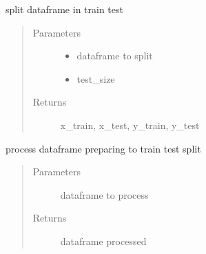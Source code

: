 \documentclass[letterpaper,10pt,english]{sphinxmanual}
\begin{document}
\begin{fulllineitems}
\label{\detokenize{algorithms:algorithms.isg.isg_trainer.__create_train_test}}
\sphinxAtStartPar
split dataframe in train test
\begin{quote}\begin{description}
\item[{Parameters}] \leavevmode\begin{itemize}
\item {} 
\sphinxAtStartPar
{} \textendash{} dataframe to split

\item {} 
\sphinxAtStartPar
{} \textendash{} test\_size

\end{itemize}

\item[{Returns}] \leavevmode
\sphinxAtStartPar
x\_train, x\_test, y\_train, y\_test

\end{description}\end{quote}

\end{fulllineitems}


\begin{fulllineitems}
\label{\detokenize{algorithms:algorithms.isg.isg_trainer.__do_processing}}
\sphinxAtStartPar
process dataframe preparing to train test split
\begin{quote}\begin{description}
\item[{Parameters}] \leavevmode
\sphinxAtStartPar
{} \textendash{} dataframe to process

\item[{Returns}] \leavevmode
\sphinxAtStartPar
dataframe processed

\end{description}\end{quote}

\end{fulllineitems}
\end{document}
